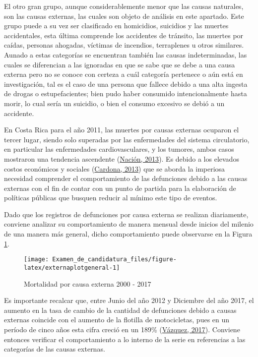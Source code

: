 \documentclass[
]{article}
\begin{document}
El otro gran grupo, aunque considerablemente menor que las causas
naturales, son las causas externas, las cuales son objeto de análisis en
este apartado. Este grupo puede a su vez ser clasificado en homicidios,
suicidios y las muertes accidentales, esta última comprende los
accidentes de tránsito, las muertes por caídas, personas ahogadas,
víctimas de incendios, terraplenes u otros similares. Aunado a estas
categorías se encuentran también las causas indeterminadas, las cuales
se diferencian a las ignoradas en que se sabe que se debe a una causa
externa pero no se conoce con certeza a cuál categoría pertenece o aún
está en investigación, tal es el caso de una persona que fallece debido
a una alta ingesta de drogas o estupefacientes; bien pudo haber
consumido intencionalmente hasta morir, lo cual sería un suicidio, o
bien el consumo excesivo se debió a un accidente.

En Costa Rica para el año 2011, las muertes por causas externas ocuparon
el tercer lugar, siendo solo superadas por las enfermedades del sistema
circulatorio, en particular las enfermedades cardiovasculares, y los
tumores, ambos casos mostraron una tendencia ascendente
(\protect\hyperlink{ref-nacion}{Nación, 2013}). Es debido a los elevados
costos económicos y sociales
(\protect\hyperlink{ref-ccpexternas}{Cardona, 2013}) que se aborda la
imperiosa necesidad comprender el comportamiento de las defunciones
debido a las causas externas con el fin de contar con un punto de
partida para la elaboración de políticas públicas que busquen reducir al
mínimo este tipo de eventos.

Dado que los registros de defunciones por causa externa se realizan
diariamente, conviene analizar su comportamiento de manera mensual desde
inicios del milenio de una manera más general, dicho comportamiento
puede observarse en la Figura \ref{fig:externaplotgeneral}.

\begin{figure}[H]
\texttt{[image: Examen\_de\_candidatura\_files/figure-latex/externaplotgeneral-1]} \caption{Mortalidad por causa externa 2000 - 2017}\label{fig:externaplotgeneral}
\end{figure}

Es importante recalcar que, entre Junio del año 2012 y Diciembre del año
2017, el aumento en la tasa de cambio de la cantidad de defunciones
debido a causas externas coincide con el aumento de la flotilla de
motocicletas, pues en un período de cinco años esta cifra creció en un
189\% (\protect\hyperlink{ref-motos}{Vázquez, 2017}). Conviene entonces
verificar el comportamiento a lo interno de la serie en referencias a
las categorías de las causas externas.
\end{document}
